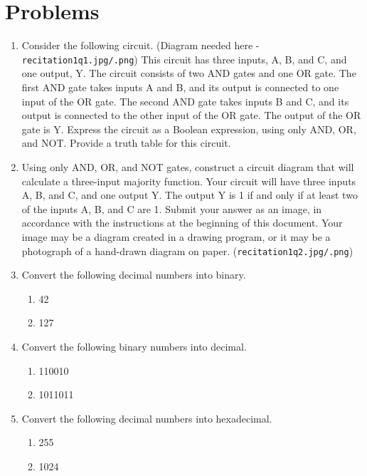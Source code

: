 \documentclass{article}
\begin{document}
\section*{Problems}
\begin{enumerate}
    \item Consider the following circuit.  (Diagram needed here -  \texttt{recitation1q1.jpg/.png}) This circuit has three inputs, A, B, and C, and one output, Y.  The circuit consists of two AND gates and one OR gate. The first AND gate takes inputs A and B, and its output is connected to one input of the OR gate. The second AND gate takes inputs B and C, and its output is connected to the other input of the OR gate. The output of the OR gate is Y. Express the circuit as a Boolean expression, using only AND, OR, and NOT. Provide a truth table for this circuit.

    \item Using only AND, OR, and NOT gates, construct a circuit diagram that will calculate a three-input majority function.  Your circuit will have three inputs A, B, and C, and one output Y. The output Y is 1 if and only if at least two of the inputs A, B, and C are 1. Submit your answer as an image, in accordance with the instructions at the beginning of this document. Your image may be a diagram created in a drawing program, or it may be a photograph of a hand-drawn diagram on paper. (\texttt{recitation1q2.jpg/.png})

    \item Convert the following decimal numbers into binary.
    \begin{enumerate}
        \item 42
        \item 127
    \end{enumerate}

    \item Convert the following binary numbers into decimal.
    \begin{enumerate}
        \item 110010
        \item 1011011
    \end{enumerate}

    \item Convert the following decimal numbers into hexadecimal.
    \begin{enumerate}
        \item 255
        \item 1024
    \end{enumerate}


\end{enumerate}
\end{document}
